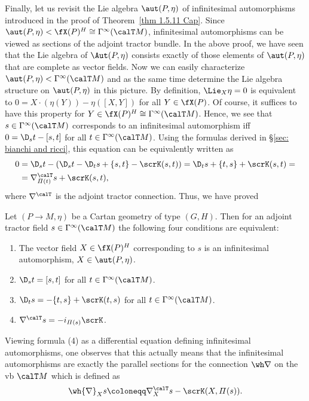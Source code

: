 Finally, let us revisit the Lie algebra $\aut(P,\eta)$ of infinitesimal automorphisms introduced in the proof of Theorem~\ref{thm 1.5.11 Cap}. Since $\aut(P,\eta)<\fX(P)^H\cong\Gamma^\infty(\calT M)$, infinitesimal automorphisms can be viewed as sections of the adjoint tractor bundle. In the above proof, we have seen that the Lie algebra of $\Aut(P,\eta)$ consists exactly of those elements of $\aut(P,\eta)$ that are complete as vector fields. Now we can easily characterize $\aut(P,\eta)<\Gamma^\infty(\calT M)$ and as the same time determine the Lie algebra structure on $\aut(P,\eta)$ in this picture. By definition, $\Lie_X \eta=0$ is equivalent to $0=X\cdot(\eta(Y))-\eta([X,Y])$ for all $Y\in\fX(P)$. Of course, it suffices to have this property for $Y\in \fX(P)^H\cong \Gamma^\infty(\calT M)$. Hence, we see that $s\in\Gamma^\infty(\calT M)$ corresponds to an infinitesimal automorphism iff $0=\D_s t-[s,t]$ for all $t\in\Gamma^\infty(\calT M)$. Using the formulas derived in \S\ref{sec: bianchi and ricci}, this equation can be equivalently written as 
\begin{align}
    0&=\D_s t-(\D_s t-\D_t s+\{s,t\}-\scrK(s,t))=\D_t s+\{t,s\}+\scrK(s,t)=\\
    &=\nabla^\calT_{\varPi(t)}s+\scrK(s,t),
\end{align}
where $\nabla^\calT$ is the adjoint tractor connection. Thus, we have proved 

\begin{lem}\label{lem 1.5.12 Cap}
    Let $(P\to M,\eta)$ be a Cartan geometry of type $(G,H)$. Then for an adjoint tractor field $s\in\Gamma^\infty(\calT M)$ the following four conditions are equivalent:
    \begin{enumerate}[label=(\arabic*)]
        \item The vector field $X\in\fX(P)^H$ corresponding to $s$ is an infinitesimal automorphism, $X\in\aut(P,\eta)$.
        \item $\D_s t=[s,t]$ for all $t\in\Gamma^\infty(\calT M)$.
        \item $\D_t s=-\{t,s\}+\scrK(t,s)$ for all $t\in\Gamma^\infty(\calT M)$.
        \item $\nabla^\calT s=-i_{\varPi(s)}\scrK$.
    \end{enumerate}
\end{lem}

Viewing formula (4) as a differential equation defining infinitesimal automorphisms, one observes that this actually means that the infinitesimal automorphisms are exactly the parallel sections for the connection $\wh\nabla$ on the \gls{vb} $\calT M$ which is defined as \[\wh{\nabla}_X s\coloneqq \nabla^\calT_X s-\scrK(X,\varPi(s)).\]

